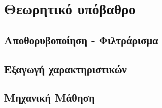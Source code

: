 \documentclass[11pt,a4paper,english,greek,oneside]{../Thesis}
\begin{document}
\chapter{Θεωρητικό υπόβαθρο}\label{chap:Background}

\section{Αποθορυβοποίηση - Φιλτράρισμα}

\section{Εξαγωγή χαρακτηριστικών}

\section{Μηχανική Μάθηση}
\end{document}
